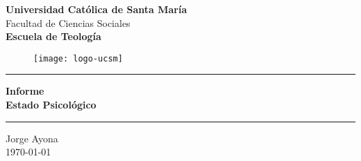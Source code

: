 \begin{titlepage}
	
	\begin{center}
		\huge \textbf{Universidad Católica de Santa María}\\[1cm]
		
		\large Facultad de Ciencias Sociales\\[3mm]
		\textbf{Escuela de Teología}\\[3mm]
		
		\begin{figure}[h]
			\centering
			\texttt{[image: logo-ucsm]}
		\end{figure}
		
		\vspace{3mm}
		
	\textcolor{cato} {\rule{\linewidth}{0.5mm}}	
		
		\vspace{1mm}
		{\large\textbf{Informe \\ Estado Psicológico}}\\
		\vspace{1mm}
		
		\textcolor{cato} {\rule{\linewidth}{0.5mm}}
		
		\vspace{5mm}
		\large{Jorge Ayona}\\
		\vspace{2mm}
		\today
		
	\end{center}
	
\end{titlepage}
